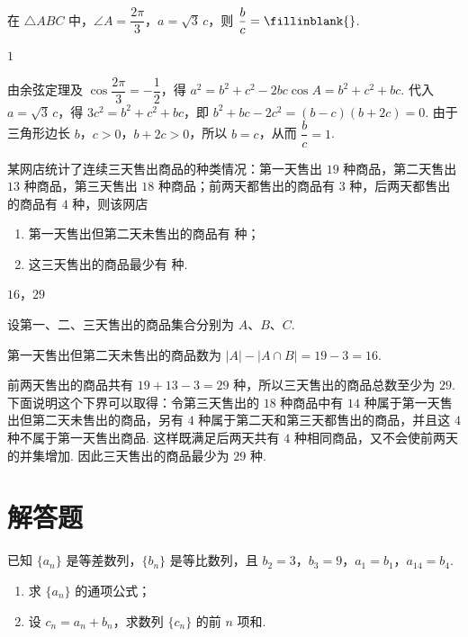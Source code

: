 \begin{problem}
在 \(\triangle ABC\) 中，\(\angle A=\dfrac{2\pi}{3}\)，\(a=\sqrt3\,c\)，则 \(\dfrac{b}{c}=\fillinblank{}\).
\end{problem}

\begin{answer}
\(1\)
\end{answer}

\begin{solution}
由余弦定理及 \(\cos\dfrac{2\pi}{3}=-\dfrac12\)，得 \(a^2=b^2+c^2-2bc\cos A=b^2+c^2+bc\).
代入 \(a=\sqrt3\,c\)，得
\(3c^2=b^2+c^2+bc\)，即 \(b^2+bc-2c^2=(b-c)(b+2c)=0\).
由于三角形边长 \(b\)，\(c>0\)，\(b+2c>0\)，所以 \(b=c\)，从而 \(\dfrac bc=1\).
\end{solution}

\begin{problem}
某网店统计了连续三天售出商品的种类情况：第一天售出 \(19\) 种商品，第二天售出 \(13\) 种商品，第三天售出 \(18\) 种商品；前两天都售出的商品有 \(3\) 种，后两天都售出的商品有 \(4\) 种，则该网店

\begin{enumerate}
\item 第一天售出但第二天未售出的商品有\fillinblank{} 种；
\item 这三天售出的商品最少有\fillinblank{} 种.
\end{enumerate}
\end{problem}

\begin{answer}
\(16\)，\(29\)
\end{answer}

\begin{solution}
设第一、二、三天售出的商品集合分别为 \(A\)、\(B\)、\(C\).

第一天售出但第二天未售出的商品数为 \(|A|-|A\cap B|=19-3=16\).

前两天售出的商品共有 \(19+13-3=29\) 种，所以三天售出的商品总数至少为 \(29\). 下面说明这个下界可以取得：令第三天售出的 \(18\) 种商品中有 \(14\) 种属于第一天售出但第二天未售出的商品，另有 \(4\) 种属于第二天和第三天都售出的商品，并且这 \(4\) 种不属于第一天售出商品. 这样既满足后两天共有 \(4\) 种相同商品，又不会使前两天的并集增加. 因此三天售出的商品最少为 \(29\) 种.
\end{solution}

\section{解答题}

\begin{problem}
已知 \(\{a_n\}\) 是等差数列，\(\{b_n\}\) 是等比数列，且 \(b_2=3\)，\(b_3=9\)，\(a_1=b_1\)，\(a_{14}=b_4\).

\begin{enumerate}
\item 求 \(\{a_n\}\) 的通项公式；
\item 设 \(c_n=a_n+b_n\)，求数列 \(\{c_n\}\) 的前 \(n\) 项和.
\end{enumerate}
\end{problem}

